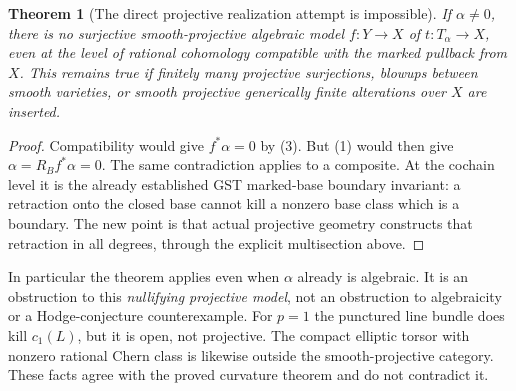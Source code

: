 \documentclass[11pt]{article}
\newtheorem{theorem}{Theorem}
\begin{document}
\begin{theorem}[The direct projective realization attempt is impossible]\label{thm:noproper}
If $\alpha\ne0$, there is no surjective smooth-projective algebraic model
$f:Y\to X$ of $t:T_\alpha\to X$, even at the level of rational cohomology
compatible with the marked pullback from $X$. This remains true if finitely
many projective surjections, blowups between smooth varieties, or smooth
projective generically finite alterations over $X$ are inserted.
\end{theorem}
\begin{proof}
Compatibility would give $f^*\alpha=0$ by (3). But (1) would then give
$\alpha=R_B f^*\alpha=0$. The same contradiction applies to a composite.
At the cochain level it is the already established GST marked-base
boundary invariant: a retraction onto the closed base cannot kill a
nonzero base class which is a boundary. The new point is that actual
projective geometry constructs that retraction in all degrees, through
the explicit multisection above.
\end{proof}
In particular the theorem applies even when $\alpha$ already is algebraic.
It is an obstruction to this \emph{nullifying projective model}, not an
obstruction to algebraicity or a Hodge-conjecture counterexample. For
$p=1$ the punctured line bundle does kill $c_1(L)$, but it is open, not
projective. The compact elliptic torsor with nonzero rational Chern class
is likewise outside the smooth-projective category. These facts agree
with the proved curvature theorem and do not contradict it.
\end{document}
